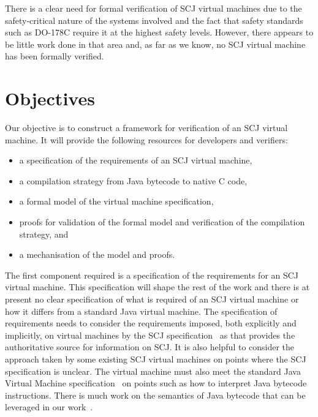 \documentclass[a4paper,10pt]{report}
\begin{document}
There is a clear need for formal verification of SCJ virtual machines
due to the safety-critical nature of the systems involved and the fact
that safety standards such as DO-178C require it at the highest safety
levels.
However, there appears to be little work done in that area and, as far
as we know, no SCJ virtual machine has been formally verified.


\section{Objectives}

Our objective is to construct a framework for verification of an SCJ
virtual machine.
It will provide the following resources for developers and verifiers:
\begin{itemize}
\item a specification of the requirements of an SCJ virtual machine,
\item a compilation strategy from Java bytecode to native C code,
\item a formal model of the virtual machine specification,
\item proofs for validation of the formal model and verification of
  the compilation strategy, and
\item a mechanisation of the model and proofs.
\end{itemize}

The first component required is a specification of the requirements
for an SCJ virtual machine.
This specification will shape the rest of the work and there is at
present no clear specification of what is required of an SCJ virtual
machine or how it differs from a standard Java virtual machine.
The specification of requirements needs to consider the requirements
imposed, both explicitly and implicitly, on virtual machines by the
SCJ specification~\cite{locke2013} as that provides the authoritative
source for information on SCJ.
It is also helpful to consider the approach taken by some existing SCJ
virtual machines on points where the SCJ specification is unclear.
The virtual machine must also meet the standard Java Virtual Machine
specification~\cite{lindholm2014} on points such as how to interpret
Java bytecode instructions.
There is much work on the semantics of Java bytecode that can be
leveraged in our work~\cite{bertelsen2000, jones1998, stark2001}.
\end{document}

